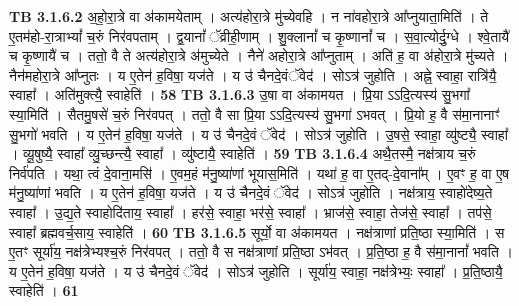 \documentclass[17pt]{extarticle}
\begin{document}
{{                  \newline
                                \textbf{ TB 3.1.6.2} \newline
                  अ॒हो॒रा॒त्रे वा अ॑कामयेताम् । अत्य॑होरा॒त्रे मु॑च्येवहि । न ना॑वहोरा॒त्रे आ᳚प्नुयाता॒मिति॑ । ते ए॒तम॑हो-रा॒त्राभ्यां᳚ च॒रुं निर॑वपताम् ।  द्व॒यानां᳚ ॅव्रीही॒णाम् । शु॒क्लानां᳚ च कृ॒ष्णानां᳚ च । स॒वा॒त्योर्दु॒ग्धे । श्वे॒तायै॑ च कृ॒ष्णायै॑ च । ततो॒ वै ते अत्य॑होरा॒त्रे अ॑मुच्येते । नैने॑ अहोरा॒त्रे आ᳚प्नुताम् । अति॑ ह॒ वा अ॑होरा॒त्रे मु॑च्यते । नैन॑महोरा॒त्रे आ᳚प्नुतः । य ए॒तेन॑ ह॒विषा॒ यज॑ते । य उ॑ चैनदे॒वंॅवेद॑ । सोऽत्र॑ जुहोति । अह्ने॒ स्वाहा॒ रात्रि॑यै॒ स्वाहा᳚ । अति॑मुक्त्यै॒ स्वाहेति॑ । \textbf{ 58} \newline
                  \newline
                                \textbf{ TB 3.1.6.3} \newline
                  उ॒षा वा अ॑कामयत । प्रि॒या ऽऽदि॒त्यस्य॑ सु॒भगा᳚ स्या॒मिति॑ । सैतमु॒षसे॑ च॒रुं निर॑वपत् । ततो॒ वै सा प्रि॒या ऽऽदि॒त्यस्य॑ सु॒भगा॑ ऽभवत् । प्रि॒यो ह॒ वै स॑मा॒नानाꣳ॑ सु॒भगो॑ भवति । य ए॒तेन॑ ह॒विषा॒ यज॑ते । य उ॑ चैनदे॒वं ॅवेद॑ । सोऽत्र॑ जुहोति । उ॒षसे॒ स्वाहा॒ व्यु॑ष्ट्यै॒ स्वाहा᳚ । व्यू॒षुष्यै॒ स्वाहा᳚ व्यु॒च्छन्त्यै॒ स्वाहा᳚ । व्यु॑ष्टायै॒ स्वाहेति॑ । \textbf{ 59} \newline
                  \newline
                                \textbf{ TB 3.1.6.4} \newline
                  अथै॒तस्मै॒ नक्ष॑त्राय च॒रुं निर्व॑पति । यथा॒ त्वं दे॒वाना॒मसि॑ । ए॒वम॒हं म॑नु॒ष्या॑णां भूयास॒मिति॑ । यथा॑ ह॒ वा ए॒तद्-दे॒वाना᳚म् । ए॒वꣳ ह॒ वा ए॒ष म॑नु॒ष्या॑णां भवति । य ए॒तेन॑ ह॒विषा॒ यज॑ते । य उ॑ चैनदे॒वं ॅवेद॑ । सोऽत्र॑ जुहोति । नक्ष॑त्राय॒ स्वाहो॑देष्य॒ते स्वाहा᳚ । उ॒द्य॒ते स्वाहोदि॑ताय॒ स्वाहा᳚ । हर॑से॒ स्वाहा॒ भर॑से॒ स्वाहा᳚ । भ्राज॑से॒ स्वाहा॒ तेज॑से॒ स्वाहा᳚ । तप॑से॒ स्वाहा᳚ ब्रह्मवर्च॒साय॒ स्वाहेति॑ । \textbf{ 60} \newline
                  \newline
                                \textbf{ TB 3.1.6.5} \newline
                  सूर्यो॒ वा अ॑कामयत । नक्ष॑त्राणां प्रति॒ष्ठा स्या॒मिति॑ । स ए॒तꣳ सूर्या॑य॒ नक्ष॑त्रेभ्यश्च॒रुं निर॑वपत् । ततो॒ वै स नक्ष॑त्राणां प्रति॒ष्ठा ऽभ॑वत् । प्र॒ति॒ष्ठा ह॒ वै स॑मा॒नानां᳚ भवति । य ए॒तेन॑ ह॒विषा॒ यज॑ते । य उ॑ चैनदे॒वं ॅवेद॑ । सोऽत्र॑ जुहोति । सूर्या॑य॒ स्वाहा॒ नक्ष॑त्रेभ्यः॒ स्वाहा᳚ । प्र॒ति॒ष्ठायै॒ स्वाहेति॑ । \textbf{ 61} \newline
                  \newline
}}
\end{document}
